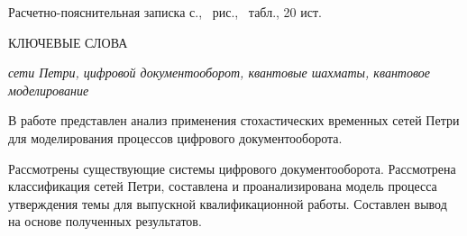 {\par}


Расчетно-пояснительная записка \pageref{LastPage} с., \totalfigures\ рис., \totaltables\ табл., 20 ист.

КЛЮЧЕВЫЕ СЛОВА

\textit{сети Петри, цифровой документооборот, квантовые шахматы, квантовое моделирование}

В работе представлен анализ применения стохастических временных сетей Петри для моделирования процессов цифрового документооборота.

Рассмотрены существующие системы цифрового документооборота. Рассмотрена классификация сетей Петри, составлена и проанализирована модель процесса утверждения темы для выпускной квалификационной работы. Составлен вывод на основе полученных результатов.

\clearpage
